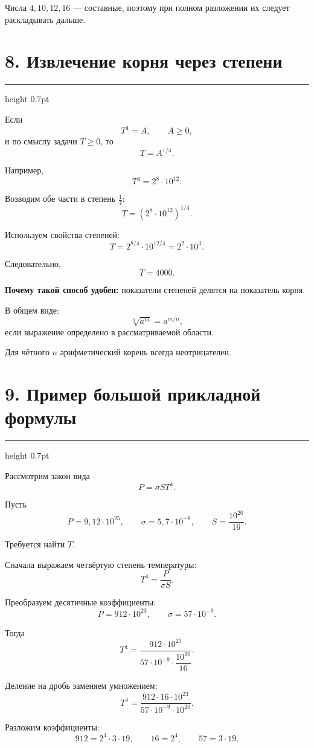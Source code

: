 \documentclass[a4paper,12pt]{article}
\newcommand{\sectionline}{%
    \par\vspace{0.15em}
    {\color{lightaccent}\hrule height 0.7pt}
    \vspace{0.7em}
}
\newcommand{\key}[1]{\textcolor{darkaccent}{\textbf{#1}}}
\begin{document}
Числа \(4,10,12,16\) --- составные, поэтому при полном разложении их следует
раскладывать дальше.

\section*{\textcolor{darkaccent}{8. Извлечение корня через степени}}

\sectionline

Если
\[
T^4=A,
\qquad
A\ge0,
\]
и по смыслу задачи \(T\ge0\), то
\[
T=A^{1/4}.
\]

Например,
\[
T^4=2^8\cdot10^{12}.
\]

Возводим обе части в степень \(\frac14\):
\[
T=
\left(
2^8\cdot10^{12}
\right)^{1/4}.
\]

Используем свойства степеней:
\[
T=
2^{8/4}\cdot10^{12/4}
=
2^2\cdot10^3.
\]

Следовательно,
\[
\boxed{T=4000}.
\]

\key{Почему такой способ удобен:} показатели степеней делятся на показатель
корня.

В общем виде:
\[
\sqrt[n]{a^m}=a^{m/n},
\]
если выражение определено в рассматриваемой области.

Для чётного \(n\) арифметический корень всегда неотрицателен.

\section*{\textcolor{darkaccent}{9. Пример большой прикладной формулы}}

\sectionline

Рассмотрим закон вида
\[
P=\sigma S T^4.
\]

Пусть
\[
P=9,12\cdot10^{25},
\qquad
\sigma=5,7\cdot10^{-8},
\qquad
S=\frac{10^{20}}{16}.
\]

Требуется найти \(T\).

Сначала выражаем четвёртую степень температуры:
\[
T^4=\frac{P}{\sigma S}.
\]

Преобразуем десятичные коэффициенты:
\[
P=912\cdot10^{23},
\qquad
\sigma=57\cdot10^{-9}.
\]

Тогда
\[
T^4=
\frac{
912\cdot10^{23}
}{
57\cdot10^{-9}\cdot\dfrac{10^{20}}{16}
}.
\]

Деление на дробь заменяем умножением:
\[
T^4=
\frac{
912\cdot16\cdot10^{23}
}{
57\cdot10^{-9}\cdot10^{20}
}.
\]

Разложим коэффициенты:
\[
912=2^4\cdot3\cdot19,
\qquad
16=2^4,
\qquad
57=3\cdot19.
\]
\end{document}
